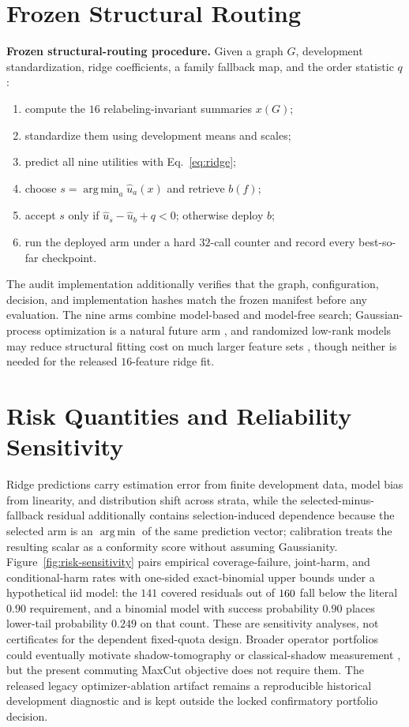 \documentclass[aps,prx,reprint,superscriptaddress,floatfix]{revtex4-2}
\newcommand{\argminop}{\operatorname*{arg\,min}}
\begin{document}
\section{Frozen Structural Routing}
\label{app:algorithm}

\noindent\textbf{Frozen structural-routing procedure.}
Given a graph $G$, development standardization, ridge coefficients, a family
fallback map, and the order statistic $q$:
\begin{enumerate}
\item compute the $16$ relabeling-invariant summaries $x(G)$;
\item standardize them using development means and scales;
\item predict all nine utilities with Eq.~\eqref{eq:ridge};
\item choose $s=\argminop_a\widehat u_a(x)$ and retrieve $b(f)$;
\item accept $s$ only if $\widehat u_s-\widehat u_b+q<0$; otherwise deploy $b$;
\item run the deployed arm under a hard $32$-call counter and record every
best-so-far checkpoint.
\end{enumerate}
The audit implementation additionally verifies that the graph, configuration,
decision, and implementation hashes match the frozen manifest before any
evaluation.  The nine arms combine model-based and model-free search;
Gaussian-process optimization is a natural future arm
\citep{snoek2012practical,balandat2020botorch}, and randomized low-rank models
may reduce structural fitting cost on much larger feature sets
\citep{martinsson2020randomized}, though neither is needed for the released
$16$-feature ridge fit.

\section{Risk Quantities and Reliability Sensitivity}
\label{app:risk}

Ridge predictions carry estimation error from finite development data, model bias
from linearity, and distribution shift across strata, while the
selected-minus-fallback residual additionally contains selection-induced
dependence because the selected arm is an $\argminop$ of the same prediction
vector; calibration treats the resulting scalar as a conformity score without
assuming Gaussianity.  Figure~\ref{fig:risk-sensitivity} pairs empirical
coverage-failure, joint-harm, and conditional-harm rates with one-sided
exact-binomial upper bounds under a hypothetical iid model: the $141$ covered
residuals out of $160$ fall below the literal $0.90$ requirement, and a
binomial model with success probability $0.90$ places lower-tail probability
$0.249$ on that count.  These are sensitivity analyses, not certificates for the
dependent fixed-quota design.  Broader operator portfolios could eventually
motivate shadow-tomography or classical-shadow measurement
\citep{aaronson2018shadow,huang2020shadows}, but the present commuting MaxCut
objective does not require them.  The released legacy optimizer-ablation
artifact remains a reproducible historical development diagnostic and is kept
outside the locked confirmatory portfolio decision.
\end{document}
